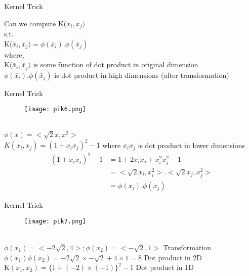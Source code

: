 \documentclass{beamer}
\begin{document}
	\begin{frame}{Kernel Trick}
	
	    Can we compute K($\bar{x}_{i}, \bar{x}_{j})$ \\
	    s.t. \\
	    K($\bar{x}_{i}, \bar{x}_{j}) = \phi(\bar{x}_{i}).\phi(\bar{x}_{j})$ \\
	    where, \\
	    K($\bar{x}_{i}, \bar{x}_{j})$ is some function of dot product in original dimension \\
	    $\phi(\bar{x}_{i}).\phi(\bar{x}_{j})$ is dot product in high dimensions (after transformation)
	\end{frame}
	\begin{frame}{Kernel Trick}
	\vspace{-2cm}
	\begin{minipage}{0.3\textwidth}
    
      \begin{figure}
      
       \texttt{[image: pik6.png]}
      \end{figure}
  \end{minipage} \\
  \vspace{-3cm}
	    $\phi(x) = <\sqrt{2}x, x^{2}>$ \\
	    $K(x_{i}, x_{j}) = (1 + x_{i}x_{j})^{2} - 1$ where $x_{i}x_{j}$ is dot product in lower dimensions \\
	    \begin{align*}
	        (1 + x_{i}x_{j})^{2} - 1 &= 1 + 2x_{i}x_{j} + x_{i}^{2}x_{j}^{2} - 1 \\
	        &= <\sqrt{2}x_{i}, x_{i}^{2}> . <\sqrt{2}x_{j}, x_{j}^{2}>\\
	        &= \phi(x_{i}).\phi(x_{j})
	    \end{align*}
	\end{frame}
	\begin{frame}{Kernel Trick}
	\vspace{-1cm}
	\begin{minipage}{0.3\textwidth}
    
      \begin{figure}
      
       \texttt{[image: pik7.png]}
      \end{figure}
  \end{minipage} \\
  \vspace{-2cm}
	    $\phi(x_{1}) = <-2\sqrt{2}, 4>; \phi(x_{2}) = <-\sqrt{2}, 1>$ Transformation \\
	    $\phi(x_{1})\phi(x_{2}) = -2\sqrt{2}\times -\sqrt{2} + 4 \times 1 = 8$ Dot product in 2D \\
	    K$(x_{1}, x_{2}) = \{1 + (-2)\times(-1)\}^{2} - 1$ Dot product in 1D
	\end{frame}
\end{document}
